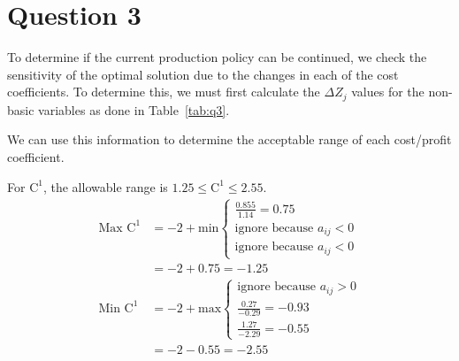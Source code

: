 \section*{Question 3}
To determine if the current production policy can be continued, we check the sensitivity of the optimal solution due to the changes in each of the cost coefficients. To determine this, we must first calculate the $\Delta Z_j$ values for the non-basic variables as done in Table~\ref{tab:q3}.

\begin{table}[htp]
	\centering
	\caption{Question 3: $\Delta Z_j$ calculation}
	\label{tab:q3}
\end{table}

We can use this information to determine the acceptable range of each cost/profit coefficient.

For $\text{C}^1$, the allowable range is $1.25 \leq \text{C}^1 \leq 2.55$.
\begin{align*}
\text{Max }\text{C}^1 &= -2 + \text{min}
\begin{cases}
	\frac{0.855}{1.14} = 0.75 \\
	\text{ignore because } a_{ij} < 0 \\
	\text{ignore because } a_{ij} < 0
\end{cases}\\
&= -2 + 0.75 = -1.25\\
\text{Min }\text{C}^1 &= -2 + \text{max}
\begin{cases}
	\text{ignore because } a_{ij} > 0 \\
	\frac{0.27}{-0.29} = -0.93 \\
	\frac{1.27}{-2.29} = -0.55
\end{cases}\\
&= -2 - 0.55 = -2.55
\end{align*}

